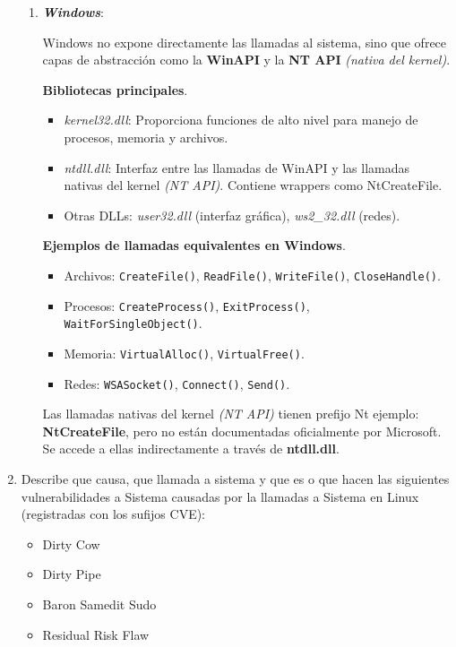 \documentclass[12pt,letterpaper]{article}
\begin{document}
\begin{enumerate}
\begin{enumerate}[label=\arabic*)]
  
  \item \textit{\textbf{Windows}}:

    Windows no expone directamente las llamadas al sistema, sino que ofrece capas de abstracción como la \textbf{WinAPI} y la \textbf{NT API} \textit{(nativa del kernel)}.

    \textbf{Bibliotecas principales}.
    \begin{itemize}
      \item \textit{kernel32.dll}: Proporciona funciones de alto nivel para manejo de procesos, memoria y archivos.
      \item \textit{ntdll.dll}: Interfaz entre las llamadas de WinAPI y las llamadas nativas del kernel \textit{(NT API)}. Contiene wrappers como NtCreateFile.
      \item Otras DLLs: \textit{user32.dll} (interfaz gráfica), \textit{ws2\_32.dll} (redes).
    \end{itemize}

    \textbf{Ejemplos de llamadas equivalentes en Windows}.
    \begin{itemize}
      \item Archivos: \texttt{CreateFile()}, \texttt{ReadFile()}, \texttt{WriteFile()}, \texttt{CloseHandle()}.
      \item Procesos: \texttt{CreateProcess()}, \texttt{ExitProcess()}, \texttt{WaitForSingleObject()}.
      \item Memoria: \texttt{VirtualAlloc()}, \texttt{VirtualFree()}.
      \item Redes: \texttt{WSASocket()}, \texttt{Connect()}, \texttt{Send()}.
    \end{itemize}
    
    Las llamadas nativas del kernel \textit{(NT API)} tienen prefijo Nt ejemplo: \textbf{NtCreateFile}, pero no están documentadas oficialmente por Microsoft. Se accede a ellas indirectamente a través de \textbf{ntdll.dll}.
  \end{enumerate}
  
  \bigskip
  
\item Describe que causa, que llamada a sistema y que es o que hacen las siguientes vulnerabilidades a Sistema causadas por la llamadas a Sistema en Linux (registradas con los sufijos CVE):
  \begin{itemize}
  \item Dirty Cow
  \item Dirty Pipe
  \item Baron Samedit Sudo
  \item Residual Risk Flaw
  \end{itemize}


\end{enumerate}
\end{document}
